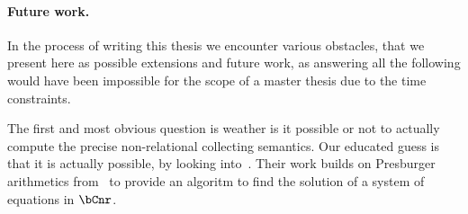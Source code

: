\paragraph*{Future work.}
In the process of writing this thesis we encounter various obstacles,
that we present here as possible extensions and future work, as
answering all the following would have been impossible for the scope
of a master thesis due to the time constraints.

The first and most obvious question is weather is it possible or not
to actually compute the precise non-relational collecting
semantics. Our educated guess is that it is actually possible, by
looking into~\cite{Lefaucheux2024}.  Their work builds on Presburger
arithmetics from~\cite{1571698599431503232} to provide an algoritm to
find the solution of a system of equations in \(\bCnr\).
